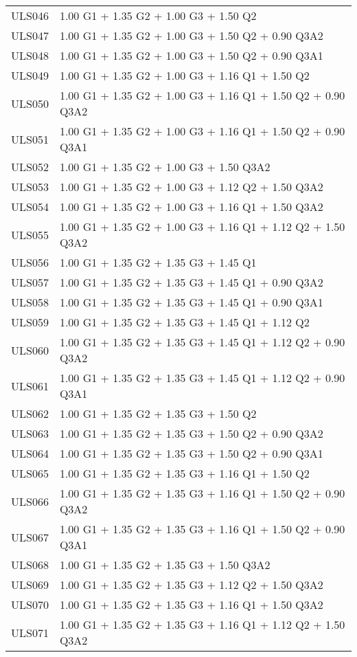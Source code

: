 \begin{center}
\begin{small}
\begin{longtable}{|l|p{10cm}|}
ULS046 & 1.00 G1 + 1.35 G2 + 1.00 G3 + 1.50 Q2\\
ULS047 & 1.00 G1 + 1.35 G2 + 1.00 G3 + 1.50 Q2 + 0.90 Q3A2\\
ULS048 & 1.00 G1 + 1.35 G2 + 1.00 G3 + 1.50 Q2 + 0.90 Q3A1\\
ULS049 & 1.00 G1 + 1.35 G2 + 1.00 G3 + 1.16 Q1 + 1.50 Q2\\
ULS050 & 1.00 G1 + 1.35 G2 + 1.00 G3 + 1.16 Q1 + 1.50 Q2 + 0.90 Q3A2\\
ULS051 & 1.00 G1 + 1.35 G2 + 1.00 G3 + 1.16 Q1 + 1.50 Q2 + 0.90 Q3A1\\
ULS052 & 1.00 G1 + 1.35 G2 + 1.00 G3 + 1.50 Q3A2\\
ULS053 & 1.00 G1 + 1.35 G2 + 1.00 G3 + 1.12 Q2 + 1.50 Q3A2\\
ULS054 & 1.00 G1 + 1.35 G2 + 1.00 G3 + 1.16 Q1 + 1.50 Q3A2\\
ULS055 & 1.00 G1 + 1.35 G2 + 1.00 G3 + 1.16 Q1 + 1.12 Q2 + 1.50 Q3A2\\
ULS056 & 1.00 G1 + 1.35 G2 + 1.35 G3 + 1.45 Q1\\
ULS057 & 1.00 G1 + 1.35 G2 + 1.35 G3 + 1.45 Q1 + 0.90 Q3A2\\
ULS058 & 1.00 G1 + 1.35 G2 + 1.35 G3 + 1.45 Q1 + 0.90 Q3A1\\
ULS059 & 1.00 G1 + 1.35 G2 + 1.35 G3 + 1.45 Q1 + 1.12 Q2\\
ULS060 & 1.00 G1 + 1.35 G2 + 1.35 G3 + 1.45 Q1 + 1.12 Q2 + 0.90 Q3A2\\
ULS061 & 1.00 G1 + 1.35 G2 + 1.35 G3 + 1.45 Q1 + 1.12 Q2 + 0.90 Q3A1\\
ULS062 & 1.00 G1 + 1.35 G2 + 1.35 G3 + 1.50 Q2\\
ULS063 & 1.00 G1 + 1.35 G2 + 1.35 G3 + 1.50 Q2 + 0.90 Q3A2\\
ULS064 & 1.00 G1 + 1.35 G2 + 1.35 G3 + 1.50 Q2 + 0.90 Q3A1\\
ULS065 & 1.00 G1 + 1.35 G2 + 1.35 G3 + 1.16 Q1 + 1.50 Q2\\
ULS066 & 1.00 G1 + 1.35 G2 + 1.35 G3 + 1.16 Q1 + 1.50 Q2 + 0.90 Q3A2\\
ULS067 & 1.00 G1 + 1.35 G2 + 1.35 G3 + 1.16 Q1 + 1.50 Q2 + 0.90 Q3A1\\
ULS068 & 1.00 G1 + 1.35 G2 + 1.35 G3 + 1.50 Q3A2\\
ULS069 & 1.00 G1 + 1.35 G2 + 1.35 G3 + 1.12 Q2 + 1.50 Q3A2\\
ULS070 & 1.00 G1 + 1.35 G2 + 1.35 G3 + 1.16 Q1 + 1.50 Q3A2\\
ULS071 & 1.00 G1 + 1.35 G2 + 1.35 G3 + 1.16 Q1 + 1.12 Q2 + 1.50 Q3A2\\

\end{longtable}
\end{small}
\end{center}
